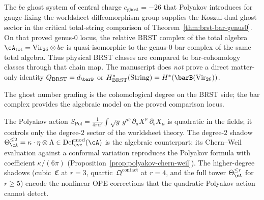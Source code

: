 \begin{remark}
\label{rem:ghost-koszul-identification}
The $bc$ ghost system of central charge $c_{\mathrm{ghost}} = -26$
that Polyakov introduces for gauge-fixing the worldsheet
diffeomorphism group supplies the Koszul-dual ghost sector in the
critical total-string comparison of
Theorem~\ref{thm:brst-bar-genus0}. On that proved genus-$0$ locus, the
relative BRST complex of the total algebra
$\cA_{\mathrm{tot}} = \mathrm{Vir}_{26} \otimes bc$ is
quasi-isomorphic to the genus-$0$ bar complex of the same total
algebra. Thus physical BRST classes are compared to bar-cohomology
classes through that chain map. The manuscript does \emph{not} prove a
direct matter-only identity
$Q_{\mathrm{BRST}} = d_{\barB}$ or
$H^*_{\mathrm{BRST}}(\mathrm{String}) = H^*(\barB(\mathrm{Vir}_{26}))$.
\par
The ghost number grading is the cohomological degree on the BRST side;
the bar complex provides the algebraic model on the proved comparison
locus.
\end{remark}

\begin{remark}
\label{rem:polyakov-action-degree-two}
The Polyakov action
$S_{\mathrm{Pol}} = \frac{1}{4\pi\alpha'}\int \sqrt{g}\,
g^{ab}\,\partial_a X^\mu\,\partial_b X_\mu$
is quadratic in the fields; it controls only the degree-$2$ sector
of the worldsheet theory. The degree-$2$ shadow
$\Theta_\cA^{\leq 2} = \kappa \cdot \eta \otimes \Lambda \in
\mathrm{Def}_{\mathrm{cyc}}^{\mathrm{mod}}(\cA)$ is the algebraic
counterpart: its Chern--Weil evaluation against a conformal
variation reproduces the Polyakov formula with coefficient
$\kappa/(6\pi)$ (Proposition~\ref{prop:polyakov-chern-weil}).
The higher-degree shadows (cubic~$\mathfrak{C}$ at $r = 3$,
quartic~$\mathfrak{Q}^{\mathrm{contact}}$ at $r = 4$, and the
full tower $\Theta_\cA^{\leq r}$ for $r \geq 5$) encode the
nonlinear OPE corrections that the quadratic Polyakov action
cannot detect.
\end{remark}

